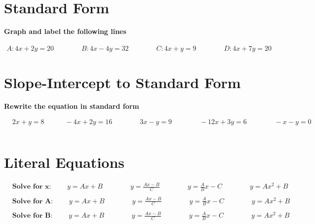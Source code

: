\documentclass{article}
\begin{document}
\section{Standard Form}
\bigskip
\textbf{Graph and label the following lines}

\bigskip

\(\begin{aligned}
	A: 4x+2y=20 \qquad\qquad B: 4x-4y=32 \qquad\qquad C: 4x+y=9 \qquad\qquad D: 4x+7y=20
\end{aligned}\)
\bigskip


\section{Slope-Intercept to Standard Form}
\bigskip
\textbf{Rewrite the equation in standard form}
\bigskip

\(\begin{aligned}
	&2x+y=8 \quad\qquad -4x+2y=16 \qquad\qquad 3x-y=9 \qquad\qquad -12x+3y=6 \qquad\qquad -x-y=0\\\\
\end{aligned}\)

\section{Literal Equations}
\bigskip
\(\begin{aligned}
	&\textbf{Solve for x: }\qquad y=Ax+B\qquad\qquad y=\frac{Ax-B}{C}\qquad\qquad y=\frac{A}{B}x-C\qquad\qquad y=Ax^2+B\\\\
	&\textbf{Solve for A: }\qquad y=Ax+B\qquad\qquad y=\frac{Ax-B}{C}\qquad\qquad y=\frac{A}{B}x-C\qquad\qquad y=Ax^2+B\\\\
	&\textbf{Solve for B: }\qquad y=Ax+B\qquad\qquad y=\frac{Ax-B}{C}\qquad\qquad y=\frac{A}{B}x-C\qquad\qquad y=Ax^2+B\\\\
\end{aligned}\)
\end{document}
